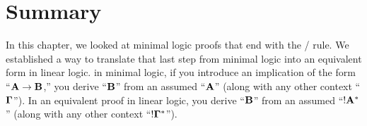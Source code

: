 \documentclass[../../../main.tex]{subfiles}
\begin{document}
\section{Summary}

In this chapter, we looked at minimal logic proofs that end with the \implIntro/ rule. We established a way to translate that last step from minimal logic into an equivalent form in linear logic. in minimal logic, if you introduce an implication of the form ``$\nd{A} \impl/ \nd{B}$,'' you derive ``$\mathbf{B}$'' from an assumed ``$\mathbf{A}$'' (along with any other context ``$\nd{\context/}$''). In an equivalent proof in linear logic, you derive ``$\mathbf{B}$'' from an assumed ``$\bang/\nd{A}^{*}$'' (along with any other context ``$\bang/\nd{\context/}^{*}$'').
\end{document}
